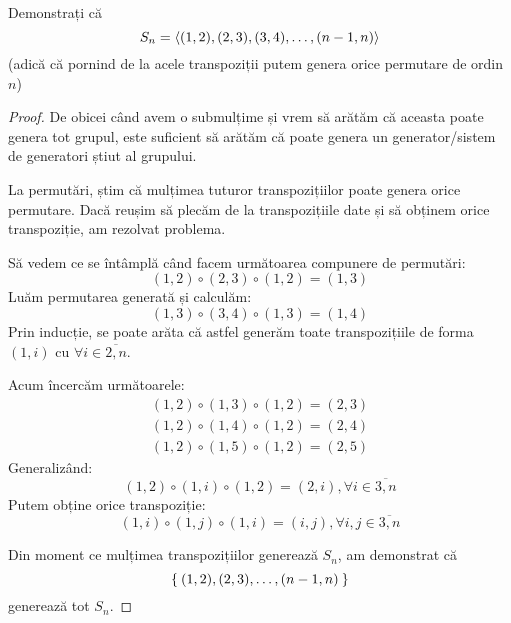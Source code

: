 \begin{exercise}
Demonstrați că
\[
    S_n = \left\langle (1, 2), (2, 3), (3, 4), \dots, (n - 1, n) \right\rangle
\]
(adică că pornind de la acele transpoziții putem genera orice permutare de ordin \(n\))
\end{exercise}
\begin{proof}
De obicei când avem o submulțime și vrem să arătăm că aceasta poate genera tot grupul,
este suficient să arătăm că poate genera un generator/sistem de generatori știut al grupului.

La permutări, știm că mulțimea tuturor transpozițiilor poate genera orice permutare.
Dacă reușim să plecăm de la transpozițiile date și să obținem orice transpoziție, am rezolvat problema.

Să vedem ce se întâmplă când facem următoarea compunere de permutări:
\[
    (1, 2) \circ (2, 3) \circ (1, 2) = (1, 3)
\]
Luăm permutarea generată și calculăm:
\[
    (1, 3) \circ (3, 4) \circ (1, 3) = (1, 4)
\]
Prin inducție, se poate arăta că astfel generăm toate transpozițiile de forma \((1, i)\) cu \(\forall i \in \overline{2, n}\).

Acum încercăm următoarele:
\begin{align*}
    (1, 2) \circ (1, 3) \circ (1, 2) = (2, 3) \\
    (1, 2) \circ (1, 4) \circ (1, 2) = (2, 4) \\
    (1, 2) \circ (1, 5) \circ (1, 2) = (2, 5)
\end{align*}
Generalizând:
\[
    (1, 2) \circ (1, i) \circ (1, 2) = (2, i), \forall i \in \overline{3, n}
\]
Putem obține orice transpoziție:
\[
    (1, i) \circ (1, j) \circ (1, i) = (i, j), \forall i, j \in \overline{3, n}
\]

Din moment ce mulțimea transpozițiilor generează \(S_n\), am demonstrat că
\[
    \Set{(1, 2), (2, 3), \dots, (n - 1, n)}
\]
generează tot \(S_n\).
\end{proof}
